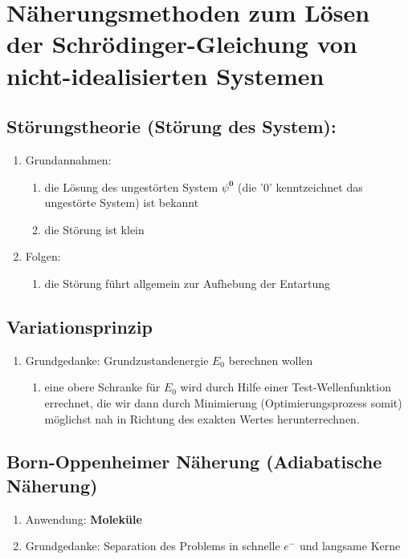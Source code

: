 \section{Näherungsmethoden zum Lösen der Schrödinger-Gleichung von nicht-idealisierten Systemen}
\subsection{Störungstheorie (Störung des System):}
\begin{enumerate}
    \item Grundannahmen:
    \begin{enumerate}
        \item die Lösung des ungestörten System $\psi^\textbf{0}$ (die '0' kenntzeichnet das ungestörte System) ist bekannt
        \item die Störung ist klein
    \end{enumerate}
    \item Folgen:
    \begin{enumerate}
        \item die Störung führt allgemein zur Aufhebung der Entartung 
    \end{enumerate}
\end{enumerate} 

\subsection{Variationsprinzip}
\begin{enumerate}
    \item Grundgedanke: Grundzustandenergie $E_0$ berechnen wollen
    \begin{enumerate}
        \item eine obere Schranke für $E_0$ wird durch Hilfe einer Test-Wellenfunktion errechnet, die wir dann durch Minimierung 
        (Optimierungsprozess somit) möglichst nah in Richtung des exakten Wertes herunterrechnen.
    \end{enumerate}
\end{enumerate}

\subsection{Born-Oppenheimer Näherung (Adiabatische Näherung)}
\begin{enumerate}
    \item Anwendung: \textbf{Moleküle}
    \item Grundgedanke: Separation des Problems in schnelle $e^-$ und langsame Kerne
\end{enumerate}